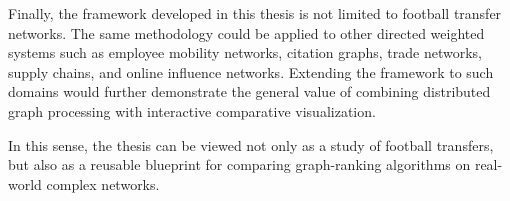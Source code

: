 Finally, the framework developed in this thesis is not limited to football transfer networks. The same methodology could be applied to other directed weighted systems such as employee mobility networks, citation graphs, trade networks, supply chains, and online influence networks. Extending the framework to such domains would further demonstrate the general value of combining distributed graph processing with interactive comparative visualization.

In this sense, the thesis can be viewed not only as a study of football transfers, but also as a reusable blueprint for comparing graph-ranking algorithms on real-world complex networks.
